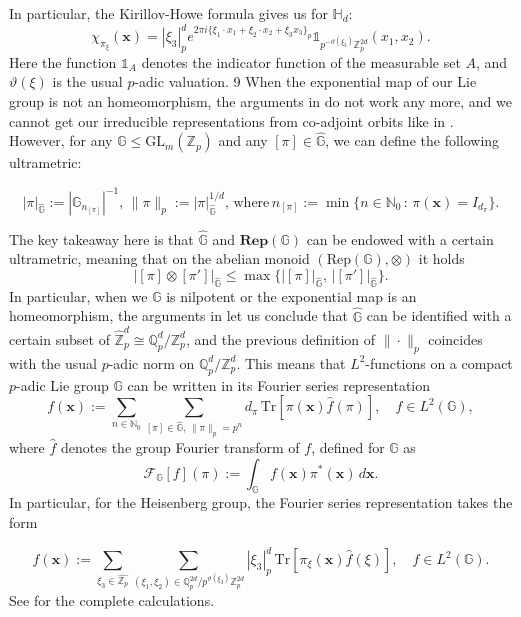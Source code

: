 \documentclass[12pt, reqno]{amsart}
\newcommand{\Q}{\mathbb{Q}}
\newcommand{\N}{\mathbb{N}}
\newcommand{\Z}{\mathbb{Z}}
\newcommand{\1}{\mathds{1}}
\newcommand{\G}{\mathbb{G}}
\begin{document}
In particular, the Kirillov-Howe formula \cite{Howe1977} gives us for $\mathbb{H}_d$:
\[
\chi_{\pi_\xi}(\mathbf{x}) = |\xi_3|_p^d e^{2\pi i \{ \xi_1 \cdot x_1 + \xi_2 \cdot x_2 + \xi_3 x_3 \}_p} \mathbb{1}_{p^{-\vartheta(\xi_3)} \mathbb{Z}_p^{2d}}(x_1, x_2)
.\]Here the function $\mathbb{1}_A$ denotes the indicator function of the measurable set $A$, and $\vartheta(\xi)$ is the usual $p$-adic valuation. 9
When the exponential map of our Lie group is not an homeomorphism, the arguments in \cite{Boyarchenko2008,Howe1977} do not work any more, and we cannot get our irreducible representations from co-adjoint orbits like in \cite{Corwin2004-kz}. However, for any $\G \leq \mathrm{GL}_m (\Z_p)$ and any $[\pi] \in \widehat{\G}$, we can define the following ultrametric: 

$$|\pi|_{\widehat{\G}}:= |\G_{n_{[\pi]}}|^{-1}, \, \| \pi \|_p:=|\pi|_{\widehat{\G}}^{1/d}, \, \text{where} \, n_{[\pi]}:= \min\{ n \in \N_0 \, : \, \pi(\mathbf{x}) = I_{d_\pi}  \}.$$


The key takeaway here is that $\widehat{\G}$ and $\mathbf{Rep}(\G)$ can be endowed with a certain ultrametric, meaning that on the abelian monoid $(\mathrm{Rep}(\G), \otimes)$ it holds $$| [\pi] \otimes [\pi'] |_{\widehat{\G}} \leq  \max \{| [\pi] |_{\widehat{\G}}, \, | [\pi'] |_{\widehat{\G}}\}.$$ In particular, when we $\G$ is nilpotent or the exponential map is an homeomorphism, the arguments in \cite{Boyarchenko2008} let us conclude that $\widehat{\G}$ can be identified with a certain subset of $\widehat{\Z}_p^d \cong \Q_p^d/\Z_p^d$, and the previous definition of $\| \cdot \|_p$ coincides with the usual $p$-adic norm on $\Q_p^d/\Z_p^d$. This means that $L^2$-functions on a compact $p$-adic Lie group $\G$ can be written in its Fourier series representation 
\begin{equation}
f(\mathbf{x}) := \sum_{n \in \N_0 } \sum_{ [ \pi] \in \widehat{\G}, \, \| \pi \|_p = p^n } d_\pi \, \mathrm{Tr}[\pi(\mathbf{x}) \widehat{f}(\pi)], \quad f \in L^2(\mathbb{G}),
\end{equation}
where $\widehat{f}$ denotes the group Fourier transform of $f$, defined for $\mathbb{G}$ as
$$\mathcal{F}_{\mathbb{G}}[f](\pi) := \int_{\mathbb{G}} f(\mathbf{x}) \pi^*(\mathbf{x})  \, d\mathbf{x}
.$$In particular, for the Heisenberg group, the Fourier series representation takes the form 

\begin{equation}
f(\mathbf{x}) := \sum_{\xi_3 \in \widehat{\mathbb{Z}_p}} \sum_{(\xi_1, \xi_2) \in \mathbb{Q}_p^{2d} / p^{\vartheta(\xi_3)} \mathbb{Z}_p^{2d}} |\xi_3|_p^d \, \mathrm{Tr}[\pi_\xi(\mathbf{x}) \widehat{f}(\xi)], \quad f \in L^2(\mathbb{G}).
\end{equation}
See \cite{velasquezrodriguez2024heisenberg} for the complete calculations. 
\end{document}
